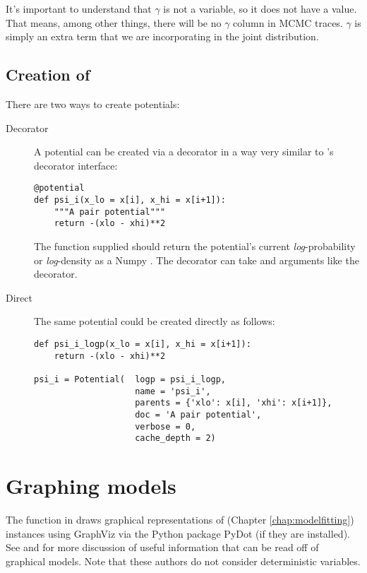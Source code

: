 It's important to understand that $\gamma$ is not a variable, so it does not have a value. That means, among other things, there will be no $\gamma$ column in MCMC traces. $\gamma$ is simply an extra term that we are incorporating in the joint distribution.


\subsection[Creation of Potentials]{Creation of }
There are two ways to create potentials:
\begin{description}
    \item[Decorator] A potential can be created via a decorator in a way very similar to 's decorator interface:
\begin{verbatim}
@potential
def psi_i(x_lo = x[i], x_hi = x[i+1]):
    """A pair potential"""
    return -(xlo - xhi)**2
\end{verbatim}
The function supplied should return the potential's current \emph{log}-probability or \emph{log}-density as a Numpy . The  decorator can take  and  arguments like the  decorator.
    \item[Direct] The same potential could be created directly as follows:
\begin{verbatim}
def psi_i_logp(x_lo = x[i], x_hi = x[i+1]):
    return -(xlo - xhi)**2
        
psi_i = Potential(  logp = psi_i_logp, 
                    name = 'psi_i',
                    parents = {'xlo': x[i], 'xhi': x[i+1]},
                    doc = 'A pair potential',
                    verbose = 0,
                    cache_depth = 2)
\end{verbatim}
\end{description}


\hypertarget{graphical}{}
\section{Graphing models} \label{graphical}

The function  in  draws graphical representations of  (Chapter \ref{chap:modelfitting}) instances using GraphViz via the Python package PyDot (if they are installed). See \cite{dawidmarkov} and \cite{Jordan:2004p5439} for more discussion of useful information that can be read off of graphical models. Note that these authors do not consider deterministic variables.

